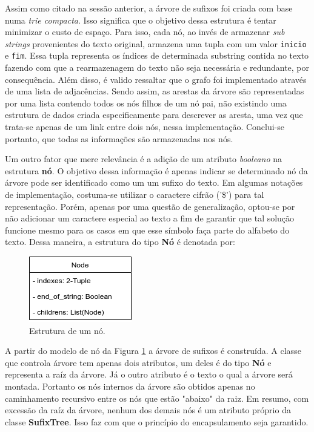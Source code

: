 
Assim como citado na sessão anterior, a árvore de sufixos foi criada com base
numa \textit{trie compacta}.
Isso significa que o objetivo dessa estrutura é tentar minimizar o custo de
espaço.
Para isso, cada nó, ao invés de armazenar \textit{sub strings} provenientes
do texto original, armazena uma tupla com um valor \texttt{inicio} e
\texttt{fim}.
Essa tupla representa os índices de determinada substring contida no texto
fazendo com que a rearmazenagem do texto não seja necessária e redundante,
por consequência.
Além disso, é valido ressaltar que o grafo foi implementado através de uma lista
de adjacências.
Sendo assim, as arestas da árvore são representadas por uma lista contendo todos
os nós filhos de um nó pai, não existindo uma estrutura de dados criada
especificamente para descrever as aresta, uma vez que trata-se apenas de um
link entre dois nós, nessa implementação.
Conclui-se portanto, que todas as informações são armazenadas nos nós.

Um outro fator que mere relevância é a adição de um atributo \textit{booleano}
na estrutura \textbf{nó}.
O objetivo dessa informação é apenas indicar se determinado nó da árvore pode
ser identificado como um um sufixo do texto.
Em algumas notações de implementação, costuma-se utilizar o caractere cifrão
('\$') para tal representação.
Porém, apenas por uma questão de generalização, optou-se por não adicionar um
caractere especial ao texto a fim de garantir que tal solução funcione mesmo
para os casos em que esse símbolo faça parte do alfabeto do texto.
Dessa maneira, a estrutura do tipo \textbf{Nó} é denotada por:

\begin{figure}[h]
	\begin{center}
		\includegraphics[scale=0.75]{Figuras/node.png}
	\end{center}
	\caption{\label{fig:node} Estrutura de um nó.}
\end{figure}

A partir do modelo de nó da Figura \ref{fig:node} a árvore de sufixos é
construída.
A classe que controla árvore tem apenas dois atributos, um deles é do tipo
\textbf{Nó} e representa a raíz da árvore.
Já o outro atributo é o texto o qual a árvore será montada.
Portanto os nós internos da árvore são obtidos apenas no caminhamento recursivo
entre os nós que estão "abaixo" da raiz.
Em resumo, com excessão da raíz da árvore, nenhum dos demais nós é um atributo
próprio da classe \textbf{SufixTree}.
Isso faz com que o princípio do encapsulamento seja garantido.

